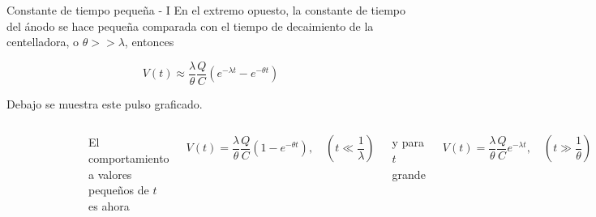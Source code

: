 \documentclass[a4paper,10pt]{beamer}
\begin{document}
\begin{frame}{Constante de tiempo pequeña - I}
En el extremo opuesto, la constante de tiempo del ánodo se hace pequeña comparada 
con el tiempo de decaimiento de la centelladora, o $\theta >> \lambda$, entonces 

\begin{equation}
 V(t) \approx \frac{\lambda}{\theta}\frac{Q}{C}(e^{-\lambda t} - e^{-\theta t})
\end{equation}

Debajo se muestra este pulso graficado. 

  \begin{columns}[c]
  
 \column{2in}
 
\begin{figure}
  \center
  \includegraphics[scale=0.37]{fig46}
  \end{figure}


 \column{2in}
  El comportamiento a valores pequeños de $t$ es ahora
  
  \begin{equation*}
   V(t) = \frac{\lambda}{\theta}\frac{Q}{C}(1 - e^{-\theta t}), \quad \left(t \ll \frac{1}{\lambda} \right)
  \end{equation*}
  
  y para $t$ grande 
  
  \begin{equation*}
   V(t) = \frac{\lambda}{\theta}\frac{Q}{C}e^{-\lambda t}, \quad \left(t \gg \frac{1}{\theta} \right)
  \end{equation*}
 
 \end{columns}
\end{frame}
\end{document}
